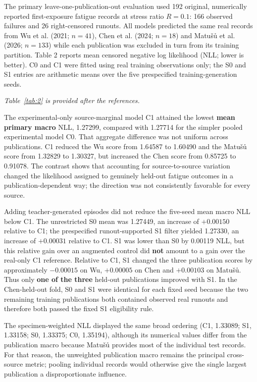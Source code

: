\documentclass[12pt,a4paper]{article}
\begin{document}
The primary leave-one-publication-out evaluation used 192 original, numerically reported first-exposure fatigue records at stress ratio \(R=0.1\): 166 observed failures and 26 right-censored runouts. All models predicted the same real records from Wu et al. (2021; \(n=41\)), Chen et al. (2024; \(n=18\)) and Matušů et al. (2026; \(n=133\)) while each publication was excluded in turn from its training partition. Table 2 reports mean censored negative log likelihood (NLL; lower is better). C0 and C1 were fitted using real training observations only; the S0 and S1 entries are arithmetic means over the five prespecified training-generation seeds.

\noindent\textit{Table~\ref{tab:2} is provided after the references.}\par

The experimental-only source-marginal model C1 attained the lowest \textbf{mean primary macro} NLL, 1.27299, compared with 1.27714 for the simpler pooled experimental model C0. That aggregate difference was not uniform across publications. C1 reduced the Wu score from 1.64587 to 1.60490 and the Matušů score from 1.32829 to 1.30327, but increased the Chen score from 0.85725 to 0.91078. The contrast shows that accounting for source-to-source variation changed the likelihood assigned to genuinely held-out fatigue outcomes in a publication-dependent way; the direction was not consistently favorable for every source.

Adding teacher-generated episodes did not reduce the five-seed mean macro NLL below C1. The unrestricted S0 mean was 1.27449, an increase of \(+0.00150\) relative to C1; the prespecified runout-supported S1 filter yielded 1.27330, an increase of \(+0.00031\) relative to C1. S1 was lower than S0 by 0.00119 NLL, but this relative gain over an augmented control did \textbf{not} amount to a gain over the real-only C1 reference. Relative to C1, S1 changed the three publication scores by approximately \(-0.00015\) on Wu, \(+0.00005\) on Chen and \(+0.00103\) on Matušů. Thus only \textbf{one of the three} held-out publications improved with S1. In the Chen-held-out fold, S0 and S1 were identical for each fixed seed because the two remaining training publications both contained observed real runouts and therefore both passed the fixed S1 eligibility rule.

The specimen-weighted NLL displayed the same broad ordering (C1, 1.33089; S1, 1.33158; S0, 1.33375; C0, 1.35194), although its numerical values differ from the publication macro because Matušů provides most of the individual test records. For that reason, the unweighted publication macro remains the principal cross-source metric; pooling individual records would otherwise give the single largest publication a disproportionate influence.
\end{document}
